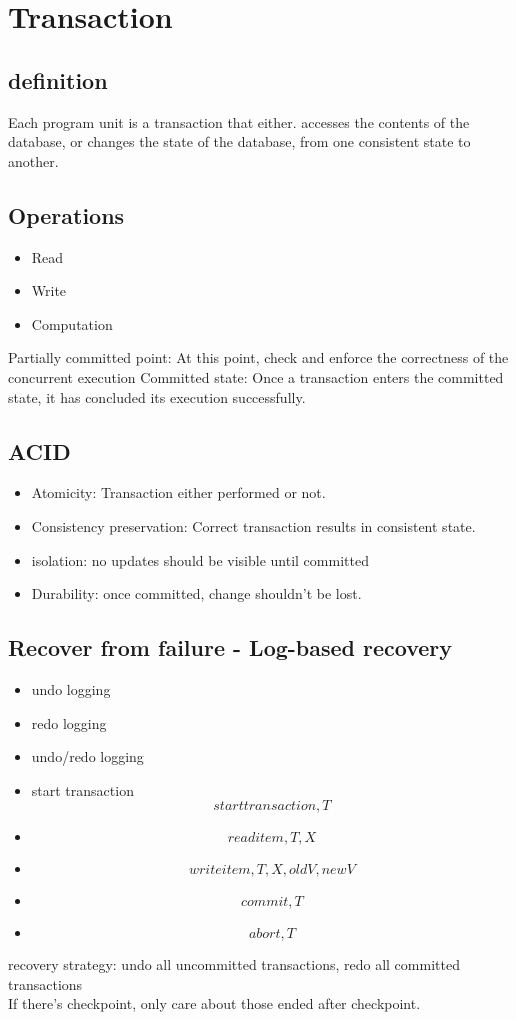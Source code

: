\documentclass[a4paper]{scrartcl}
\begin{document}
\section{Transaction}
  \subsection{definition}
    Each program unit is a transaction that either. accesses the contents of the database, or changes the state of the database, from one consistent state to another.
  \subsection{Operations}
    \begin{itemize}
      \item Read
      \item Write
      \item Computation
    \end{itemize}
    Partially committed point: At this point, check and enforce the correctness of the concurrent execution
    Committed state: Once a transaction enters the committed state, it has concluded its execution successfully.
  \subsection{ACID}
    \begin{itemize}
      \item Atomicity: Transaction either performed or not.
      \item Consistency preservation: Correct transaction results in consistent state.
      \item isolation: no updates should be visible until committed
      \item Durability: once committed, change shouldn't be lost.
    \end{itemize}
  \subsection{Recover from failure - Log-based recovery}
      \begin{itemize}
        \item undo logging
        \item redo logging
        \item undo/redo logging
      \end{itemize}
      \begin{itemize}
        \item start transaction \[start transaction, T\]
        \item \[read item, T, X\]
        \item \[write item, T, X, oldV, newV\]
        \item \[commit, T\]
        \item \[abort, T\]
      \end{itemize}
      recovery strategy: undo all uncommitted transactions, redo all committed transactions\\
      If there's checkpoint, only care about those ended after checkpoint.
\end{document}

